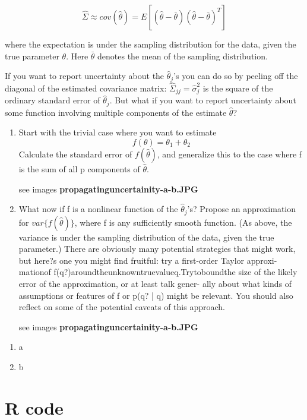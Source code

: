 \documentclass{homework}
\begin{document}
$$\hat{\Sigma} \approx cov(\hat{\theta})= E[ (\hat{\theta} - \bar{\theta})(\hat{\theta} - \bar{\theta})^T]$$

where the expectation is under the sampling distribution for the data, given the true parameter $\theta$. Here $\bar{\theta}$ denotes the mean of the sampling distribution.
\par If you want to report uncertainty about the $\hat{\theta}_j$'s you can do so by peeling off the diagonal of the estimated covariance matrix: $\hat{\Sigma}_{jj} = \hat{\sigma}_j^2$ is the square of the ordinary standard error of $\hat{\theta}_j$. But what if you want to
report uncertainty about some function involving multiple components of the estimate $\hat{\theta}$?
\begin{enumerate}[label=(\Alph*)]

\item Start with the trivial case where you want to estimate 
$$f(\theta) = \theta_1 + \theta_2$$ 
Calculate the standard error of $f(\hat{\theta})$, and generalize this to the case where f is the sum of all p components of $\hat{\theta}$.

\par * see images \textbf{propagatinguncertainity-a-b.JPG}

\item What now if f is a nonlinear function of the $\hat{\theta}_j$'s? Propose an approximation for $var\{ f(\hat{\theta} )\}$, where f is any sufficiently smooth function. (As above, the variance is under the sampling distribution of the data, given the true parameter.)
There are obviously many potential strategies that might work, but here?s one you might find fruitful: try a first-order Taylor approxi- mationof f(q?)aroundtheunknowntruevalueq.Trytoboundthe size of the likely error of the approximation, or at least talk gener- ally about what kinds of assumptions or features of f or p(q? | q) might be relevant. You should also reflect on some of the potential caveats of this approach.

\par * see images \textbf{propagatinguncertainity-a-b.JPG}
\end{enumerate}

\begin{enumerate}[label=(\Alph*)]
\item a
\item b
\end{enumerate}

\clearpage

\appendix
\chapter{R code}
\label{chap:code}
\end{document}
